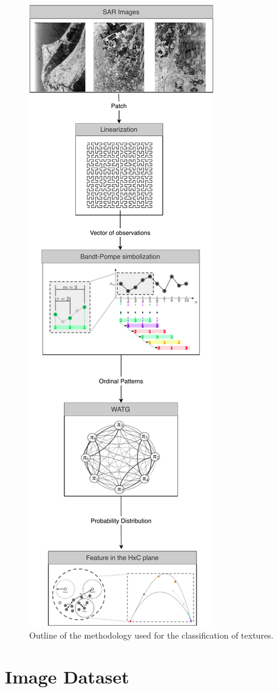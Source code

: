 \begin{figure}
	\centering
	\includegraphics[width=.4\textwidth]{Figures/MethodologySAR.pdf}
	\caption{Outline of the methodology used for the classification of textures.}
	\label{fig:WATG}
\end{figure}

\section{Image Dataset}

